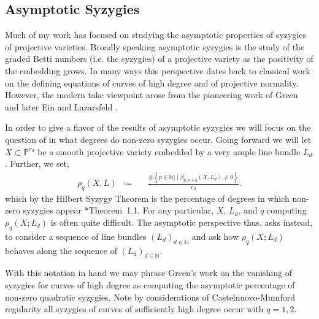 \documentclass[10pt,reqno]{amsart}
\newtheorem{theorem}[lemma]{Theorem}
\theoremstyle{remark}
\newcommand{\N}{\mathbb{N}}
\renewcommand{\P}{\mathbb{P}}
\begin{document}

\subsection{Asymptotic Syzygies}

Much of my work has focused on studying the asymptotic properties of syzygies of projective varieties. Broadly speaking asymptotic syzygies is the study of the graded Betti numbers (i.e. the syzygies) of a projective variety as the positivity of the embedding grows. In many ways this perspective dates back to classical work on the defining equations of curves of high degree and of projective normality. However, the modern take viewpoint arose from the pioneering work of Green \cite{green84-I, green84-II} and later Ein and Lazarsfeld \cite{einLazarsfeld12}. 

In order to give a flavor of the results of asymptotic syzygies we will focus on the question of in what degrees do non-zero syzygies occur. Going forward we will let $X\subset \P^{r_{d}}$ be a smooth projective variety embedded by a very ample line bundle $L_{d}$. Further, we set, 
\begin{align*}
\rho_q\left(X,L\right)\;\;\coloneqq&\ \;\; \frac{\#\left\{p\in\N |\; \big| \; \beta_{p,p+q}\left(X,L_{d}\right)\neq0\right\}}{r_{d}}.
\end{align*}
which by the Hilbert Syzygy Theorem is the percentage of degrees in which non-zero syzygies appear \cite{eisenbud05}*{Theorem~1.1}. For any particular, $X$, $L_{d}$, and $q$ computing $\rho_{q}(X;L_{d})$ is often quite difficult. The asymptotic perspective thus, asks instead, to consider a sequence of line bundles $(L_{d})_{d\in \N}$ and ask how $\rho_{q}(X;L_{d})$ behaves along the sequence of $(L_{d})_{d\in \N}$. 

With this notation in hand we may phrase Green's work on the vanishing of syzygies for curves of high degree as computing the asymptotic percentage of non-zero quadratic syzygies. Note by considerations of Castelnuovo-Mumford regularity all syzygies of curves of sufficiently high degree occur with $q=1,2$.
\end{document}
